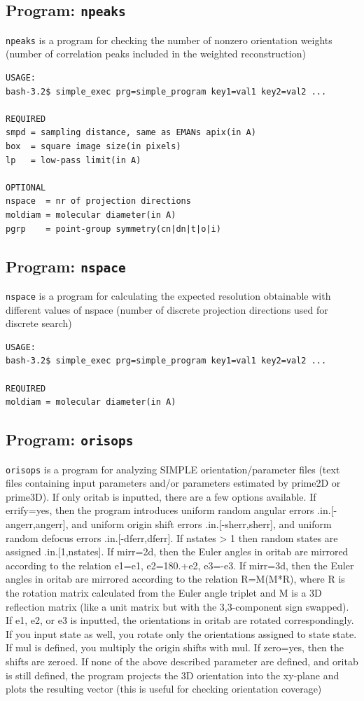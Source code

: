\documentclass[a4paper,11pt]{article}
\newcommand{\prgname}[1]{\textcolor{NavyBlue}{\texttt{#1}}}
\begin{document}
\subsection{Program: \prgname{npeaks}}
\label{npeaks}
\prgname{npeaks} is a program for checking the number of nonzero orientation weights (number of correlation peaks included in the weighted reconstruction)

\begin{verbatim}
USAGE:
bash-3.2$ simple_exec prg=simple_program key1=val1 key2=val2 ...

REQUIRED
smpd = sampling distance, same as EMANs apix(in A)
box  = square image size(in pixels)
lp   = low-pass limit(in A)

OPTIONAL
nspace  = nr of projection directions
moldiam = molecular diameter(in A)
pgrp    = point-group symmetry(cn|dn|t|o|i)
\end{verbatim}

\subsection{Program: \prgname{nspace}}
\label{nspace}
\prgname{nspace} is a program for calculating the expected resolution obtainable with different values of nspace (number of discrete projection directions used for discrete search)

\begin{verbatim}
USAGE:
bash-3.2$ simple_exec prg=simple_program key1=val1 key2=val2 ...

REQUIRED
moldiam = molecular diameter(in A)
\end{verbatim}

\subsection{Program: \prgname{orisops}}
\label{orisops}
\prgname{orisops} is a program for analyzing SIMPLE orientation/parameter files (text files containing input parameters and/or parameters estimated by prime2D or prime3D). If only oritab is inputted, there are a few options available. If errify=yes, then the program introduces uniform random angular errors .in.[-angerr,angerr], and uniform origin shift errors .in.[-sherr,sherr], and uniform random defocus errors .in.[-dferr,dferr]. If nstates > 1 then random states are assigned .in.[1,nstates]. If mirr=2d, then the Euler angles in oritab are mirrored according to the relation e1=e1, e2=180.+e2, e3=-e3. If mirr=3d, then the Euler angles in oritab are mirrored according to the relation R=M(M*R), where R is the rotation matrix calculated from the Euler angle triplet and M is a 3D reflection matrix (like a unit matrix but with the 3,3-component sign swapped). If e1, e2, or e3 is inputted, the orientations in oritab are rotated correspondingly. If you input state as well, you rotate only the orientations assigned to state state. If mul is defined, you multiply the origin shifts with mul. If zero=yes, then the shifts are zeroed. If none of the above described parameter are defined, and oritab is still defined, the program projects the 3D orientation into the xy-plane and plots the resulting vector (this is useful for checking orientation coverage)
\end{document}
